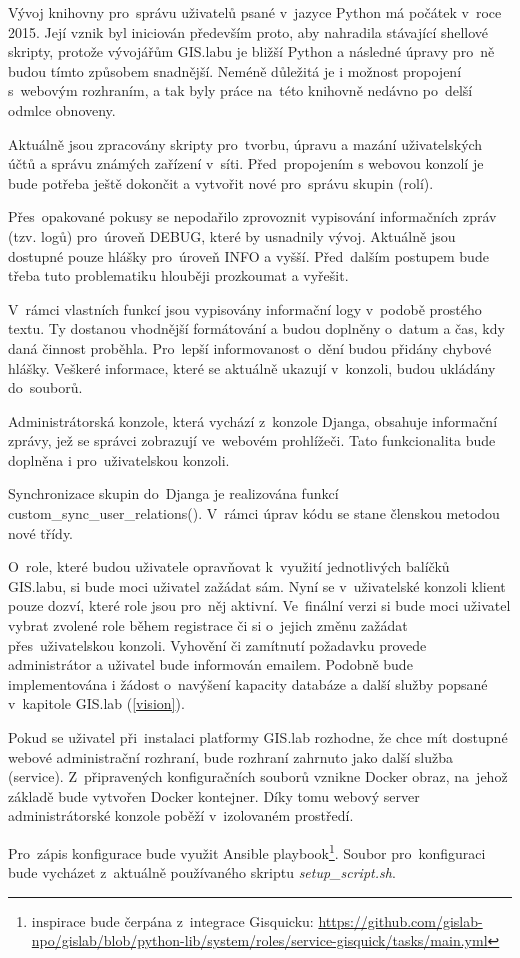 Vývoj knihovny pro~správu uživatelů psané v~jazyce Python má počátek 
v~roce 2015. Její vznik byl iniciován především proto, aby nahradila
stávající shellové skripty, protože vývojářům GIS.labu je bližší
Python a následné úpravy pro~ně budou tímto způsobem snadnější. Neméně
důležitá je i možnost propojení s~webovým rozhraním, a tak byly práce
na~této knihovně nedávno po~delší odmlce obnoveny.

Aktuálně jsou zpracovány skripty pro~tvorbu, úpravu a mazání
uživatelských účtů a správu známých zařízení v~síti. Před~propojením
s webovou konzolí je bude potřeba ještě dokončit a vytvořit nové 
pro~správu skupin (rolí).
  
Přes~opakované pokusy se nepodařilo zprovoznit vypisování informačních
zpráv (tzv. logů) pro~úroveň DEBUG, které by usnadnily vývoj. Aktuálně
jsou dostupné pouze hlášky pro~úroveň INFO a vyšší. Před~dalším
postupem bude třeba tuto problematiku hlouběji prozkoumat a vyřešit.

V~rámci vlastních funkcí jsou vypisovány informační logy v~podobě
prostého textu. Ty dostanou vhodnější formátování a budou doplněny 
o~datum a čas, kdy daná činnost proběhla. Pro~lepší informovanost o~dění
budou přidány chybové hlášky. Veškeré informace, které se aktuálně
ukazují v~konzoli, budou ukládány do~souborů.

Administrátorská konzole, která vychází z~konzole Djanga, obsahuje
informační zprávy, jež se správci zobrazují ve~webovém
prohlížeči. Tato funkcionalita bude doplněna i pro~uživatelskou
konzoli.

Synchronizace skupin do~Djanga je realizována funkcí \linebreak
\textsf{custom\_sync\_user\_relations()}. V~rámci úprav kódu se stane
členskou metodou nové třídy.

O~role, které budou uživatele opravňovat k~využití jednotlivých
balíčků GIS.labu, si bude moci uživatel zažádat sám. Nyní se 
v~uživatelské konzoli klient pouze dozví, které role jsou pro~něj
aktivní. Ve~finální verzi si bude moci uživatel vybrat zvolené role
během registrace či si o~jejich změnu zažádat přes~uživatelskou
konzoli. Vyhovění či zamítnutí požadavku provede administrátor a
uživatel bude informován emailem. Podobně bude implementována i žádost
o~navýšení kapacity databáze a další služby popsané v~kapitole GIS.lab
(\ref{vision}).

Pokud se uživatel při~instalaci platformy GIS.lab rozhodne, že chce mít 
dostupné webové administrační rozhraní, bude rozhraní zahrnuto jako 
další služba (service). Z~připravených konfiguračních souborů vznikne 
Docker obraz, na~jehož základě bude vytvořen Docker kontejner. Díky tomu 
webový server administrátorské konzole poběží v~izolovaném prostředí.

Pro~zápis konfigurace bude využit Ansible playbook\footnote{inspirace bude čerpána z~integrace Gisquicku: \href{https://github.com/gislab-npo/gislab/blob/python-lib/system/roles/service-gisquick/tasks/main.yml}{https://github.com/gislab-npo/gislab/blob/python-lib/system/roles/service-gisquick/tasks/main.yml}}. Soubor pro~konfiguraci bude vycházet z~aktuálně používaného skriptu 
\textit{setup\_script.sh}.
